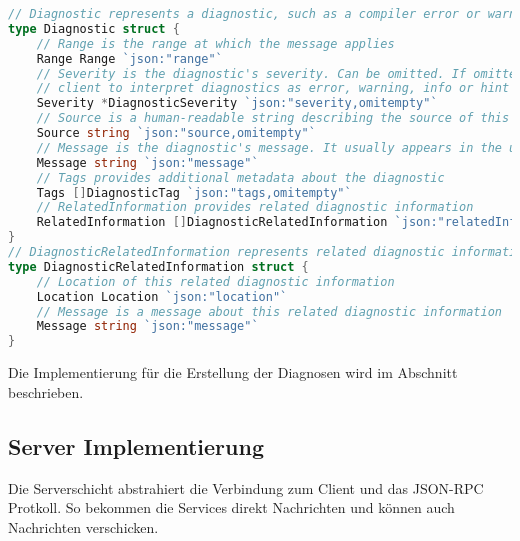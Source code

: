 \documentclass[./einleitung.tex]{subfiles}
\begin{document}
    \begin{lstlisting}[language=Go, caption=Definition des Inhalts der Benachrichtigung, label=lst:diagnostics-result]
// Diagnostic represents a diagnostic, such as a compiler error or warning
type Diagnostic struct {
	// Range is the range at which the message applies
	Range Range `json:"range"`
	// Severity is the diagnostic's severity. Can be omitted. If omitted it is up to the
	// client to interpret diagnostics as error, warning, info or hint
	Severity *DiagnosticSeverity `json:"severity,omitempty"`
    // Source is a human-readable string describing the source of this diagnostic
	Source string `json:"source,omitempty"`
	// Message is the diagnostic's message. It usually appears in the user interface
	Message string `json:"message"`
	// Tags provides additional metadata about the diagnostic
	Tags []DiagnosticTag `json:"tags,omitempty"`
	// RelatedInformation provides related diagnostic information
	RelatedInformation []DiagnosticRelatedInformation `json:"relatedInformation,omitempty"`
}
// DiagnosticRelatedInformation represents related diagnostic information, such as related diagnostics
type DiagnosticRelatedInformation struct {
	// Location of this related diagnostic information
	Location Location `json:"location"`
	// Message is a message about this related diagnostic information
	Message string `json:"message"`
}
    \end{lstlisting}
    Die Implementierung für die Erstellung der Diagnosen wird im Abschnitt  beschrieben.
    \subsection{Server Implementierung}\label{subsec:server-implementierung}
    Die Serverschicht abstrahiert die Verbindung zum Client und das JSON-RPC Protkoll.
    So bekommen die Services direkt Nachrichten und können auch Nachrichten verschicken.
\end{document}

